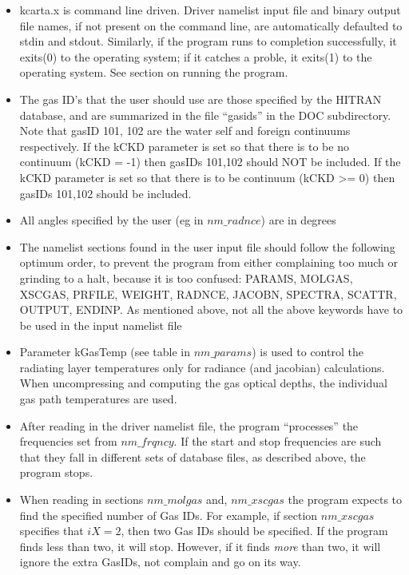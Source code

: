 \documentclass[12pt]{article}
\begin{document}
{{{\begin{itemize}
\item {\sf kcarta.x} is command line driven. Driver namelist input file and 
      binary output file names, if not present on the command line, are 
      automatically defaulted to stdin and stdout. Similarly, if the program 
      runs to completion successfully, it exits(0) to the operating system; if
      it catches a proble, it exits(1) to the operating system. See section 
      on running the program.  

\item The gas ID's that the user should use are those specified by the
  {\sf HITRAN} database, and are summarized in the file ``gasids'' in
  the {\sf DOC} subdirectory. Note that gasID 101, 102 are the water self and
  foreign continuums respectively. If the kCKD parameter is set so that there
  is to be no continuum (kCKD = -1) then gasIDs 101,102 should NOT be 
  included. If the kCKD parameter is set so that there is to be continuum 
  (kCKD >= 0) then gasIDs 101,102 should be included.
  
\item All angles specified by the user (eg in $nm\_radnce$) are in degrees
  
\item The namelist sections found in the user input file should follow the
  following optimum order, to prevent the program from either
  complaining too much or grinding to a halt, because it is too
  confused: PARAMS, MOLGAS, XSCGAS, PRFILE, WEIGHT, RADNCE, JACOBN,
  SPECTRA, SCATTR, OUTPUT, ENDINP. As mentioned above, not {\sf all} the above
  keywords have to be used in the input namelist file
  
\item Parameter {\sf kGasTemp} (see table in $nm\_params$) is used to control
  the radiating layer temperatures only for radiance (and jacobian)
  calculations.  When uncompressing and computing the gas optical
  depths, the individual gas path temperatures are used.

\item After reading in the driver namelist file, the program ``processes'' 
     the frequencies set from $nm\_frqncy$. If the start and stop frequencies
     are such that they fall in different sets of database files, as described
     above, the program stops.

\item When reading in sections $nm\_molgas$ and, $nm\_xscgas$ the program
  expects to find the specified number of Gas IDs.  For example, if
  section $nm\_xscgas$ specifies that $iX = 2$, then two Gas IDs should
  be specified.  If the program finds less than two, it will stop.
  However, if it finds {\em more} than two, it will ignore the extra
  GasIDs, not complain and go on its way.
  

\end{itemize}}}}
\end{document}

